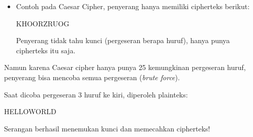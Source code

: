\documentclass{article}
\begin{document}

\begin{itemize}
    \item Contoh pada Caesar Cipher, penyerang hanya memiliki cipherteks berikut:
    
    KHOORZRUOG
    
    Penyerang tidak tahu kunci (pergeseran berapa huruf), hanya punya cipherteks itu saja.
\end{itemize}

Namun karena Caesar cipher hanya punya 25 kemungkinan pergeseran huruf, penyerang bisa mencoba semua pergeseran (\textit{brute force}).

Saat dicoba pergeseran 3 huruf ke kiri, diperoleh plainteks:

HELLOWORLD

Serangan berhasil menemukan kunci dan memecahkan cipherteks!
\end{document}
